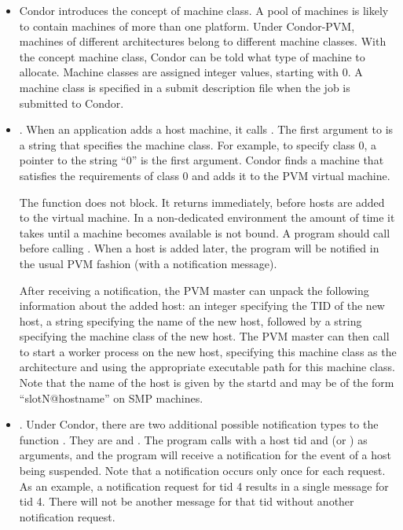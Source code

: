 \begin{itemize}

\item Condor introduces the concept of machine class.
  A pool of machines is likely to contain machines of more than
  one platform.
  Under Condor-PVM, machines of
  different architectures belong to different machine classes.
  With the concept machine class,
  Condor can be told what type
  of machine to allocate.
  Machine classes are assigned integer values, starting with 0.
  A machine class is
  specified in a submit description file when the job
  is submitted to Condor.

\item {}.  When an application
  adds a host machine, it calls .
  The first argument to 
  is a string that specifies the machine class.
  For example, to specify class 0, a pointer to the string ``0''
  is the first argument.  Condor finds a machine
  that satisfies the requirements of class 0 and adds it to the PVM
  virtual machine.

  The function  does not block.  It
  returns immediately, before hosts are added to the virtual
  machine.  
  In a non-dedicated environment the amount of time it takes until
  a machine becomes available is not bound.
  A program should call 
   before calling
  . When a host is added later, the program
  will be notified in the usual PVM 
  fashion (with a  notification message).

  After receiving a  notification, the PVM master can
  unpack the following information about the added host: an integer
  specifying the TID of the new host, a string specifying the name of
  the new host, followed by a string specifying the machine class of
  the new host.  The PVM master can then call  to
  start a worker process on the new host, specifying this machine
  class as the architecture and using the appropriate executable path
  for this machine class.  Note that the name of the host is given by
  the startd and may be of the form ``slotN@hostname'' on SMP machines.
    

\item {}.  Under Condor, there are two additional 
  possible notification types
  to the function .
  They are  and
  .
  The program calls 
  with a host tid and  (or )
  as arguments, and the program will receive
  a notification for the event of a host being suspended.
  Note that a notification occurs only once for each request.
  As an example,
  a  
  notification request for tid 4 results in a single 
  message for tid 4. 
  There will not be another  message for
  that tid without another notification request.


\end{itemize}
